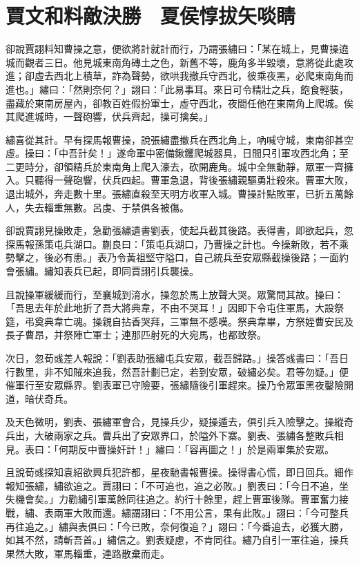 
\chapter{賈文和料敵決勝　夏侯惇拔矢啖睛}

卻說賈詡料知曹操之意，便欲將計就計而行，乃謂張繡曰：「某在城上，見曹操遶城而觀者三日。他見城東南角磚土之色，新舊不等，鹿角多半毀壞，意將從此處攻進；卻虛去西北上積草，詐為聲勢，欲哄我撤兵守西北，彼乘夜黑，必爬東南角而進也。」繡曰：「然則奈何？」詡曰：「此易事耳。來日可令精壯之兵，飽食輕裝，盡藏於東南房屋內，卻教百姓假扮軍士，虛守西北，夜間任他在東南角上爬城。俟其爬進城時，一聲砲響，伏兵齊起，操可擒矣。」

繡喜從其計。早有探馬報曹操，說張繡盡撤兵在西北角上，吶喊守城，東南卻甚空虛。操曰：「中吾計矣！」遂命軍中密備鍬钁爬城器具，日間只引軍攻西北角；至二更時分，卻領精兵於東南角上爬入濠去，砍開鹿角。城中全無動靜，眾軍一齊擁入。只聽得一聲砲響，伏兵四起。曹軍急退，背後張繡親驅勇壯殺來。曹軍大敗，退出城外，奔走數十里。張繡直殺至天明方收軍入城。曹操計點敗軍，已折五萬餘人，失去輜重無數。呂虔、于禁俱各被傷。

卻說賈詡見操敗走，急勸張繡遺書劉表，使起兵截其後路。表得書，即欲起兵，忽探馬報孫策屯兵湖口。蒯良曰：「策屯兵湖口，乃曹操之計也。今操新敗，若不乘勢擊之，後必有患。」表乃令黃祖堅守隘口，自己統兵至安眾縣截操後路；一面約會張繡。繡知表兵已起，即同賈詡引兵襲操。

且說操軍緩緩而行，至襄城到淯水，操忽於馬上放聲大哭。眾驚問其故。操曰：「吾思去年於此地折了吾大將典韋，不由不哭耳！」因即下令屯住軍馬，大設祭筵，弔奠典韋亡魂。操親自拈香哭拜，三軍無不感嘆。祭典韋畢，方祭姪曹安民及長子曹昂，并祭陣亡軍士；連那匹射死的大宛馬，也都致祭。

次日，忽荀彧差人報說：「劉表助張繡屯兵安眾，截吾歸路。」操答彧書曰：「吾日行數里，非不知賊來追我，然吾計劃已定，若到安眾，破繡必矣。君等勿疑。」便催軍行至安眾縣界。劉表軍已守險要，張繡隨後引軍趕來。操乃令眾軍黑夜鑿險開道，暗伏奇兵。

及天色微明，劉表、張繡軍會合，見操兵少，疑操遁去，俱引兵入險擊之。操縱奇兵出，大破兩家之兵。曹兵出了安眾界口，於隘外下寨。劉表、張繡各整敗兵相見。表曰：「何期反中曹操奸計！」繡曰：「容再圖之！」於是兩軍集於安眾。

且說荀彧探知袁紹欲興兵犯許都，星夜馳書報曹操。操得書心慌，即日回兵。細作報知張繡，繡欲追之。賈詡曰：「不可追也，追之必敗。」劉表曰：「今日不追，坐失機會矣。」力勸繡引軍萬餘同往追之。約行十餘里，趕上曹軍後隊。曹軍奮力接戰，繡、表兩軍大敗而還。繡謂詡曰：「不用公言，果有此敗。」詡曰：「今可整兵再往追之。」繡與表俱曰：「今已敗，奈何復追？」詡曰：「今番追去，必獲大勝，如其不然，請斬吾首。」繡信之。劉表疑慮，不肯同往。繡乃自引一軍往追，操兵果然大敗，軍馬輜重，連路散棄而走。

